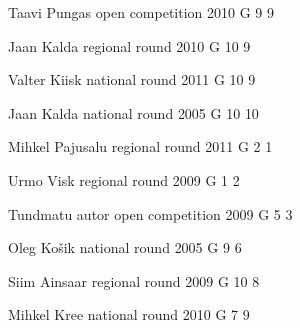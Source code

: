 \documentclass[11pt]{article}
\begin{document}
\ylDisplay{} %
{Taavi Pungas} %
{open competition} %
{2010} %
{G 9} %
{9} %
{

\ifEngSolution
\fi
}

\ylDisplay{} %
{Jaan Kalda} %
{regional round} %
{2010} %
{G 10} %
{9} %
{

\ifEngSolution
\fi
}

\ylDisplay{} %
{Valter Kiisk} %
{national round} %
{2011} %
{G 10} %
{9} %
{

\ifEngSolution
\fi
}

\ylDisplay{} %
{Jaan Kalda} %
{national round} %
{2005} %
{G 10} %
{10} %
{

\ifEngSolution
\fi
}

\ylDisplay{} %
{Mihkel Pajusalu} %
{regional round} %
{2011} %
{G 2} %
{1} %
{

\ifEngSolution
\fi
}

\ylDisplay{} %
{Urmo Visk} %
{regional round} %
{2009} %
{G 1} %
{2} %
{

\ifEngSolution
\fi
}

\ylDisplay{} %
{Tundmatu autor} %
{open competition} %
{2009} %
{G 5} %
{3} %
{

\ifEngSolution
\fi
}

\ylDisplay{} %
{Oleg Košik} %
{national round} %
{2005} %
{G 9} %
{6} %
{

\ifEngSolution
\fi
}

\ylDisplay{} %
{Siim Ainsaar} %
{regional round} %
{2009} %
{G 10} %
{8} %
{

\ifEngSolution
\fi
}

\ylDisplay{} %
{Mihkel Kree} %
{national round} %
{2010} %
{G 7} %
{9} %
{

\ifEngSolution
\fi
}
\end{document}
